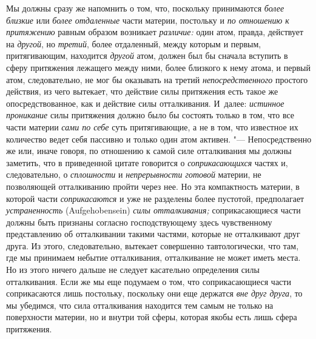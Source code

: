 Мы должны сразу же напомнить о том, что, поскольку принимаются
{\em более близкие} или {\em более
отдаленные} части материи, постольку и {\em по
отношению к притяжению} равным образом возникает
{\em различие:} один атом, правда, действует на {\em другой}, но {\em третий},
более отдаленный, между которым и первым, притягивающим, находится
{\em другой} атом, должен был бы сначала вступить в
сферу притяжения лежащего между ними, более близкого к нему атома, и первый
атом, следовательно, не мог бы оказывать на третий
{\em непосредственного} простого действия, из чего
вытекает, что действие силы притяжения есть такое же опосредствованное, как
и действие силы отталкивания. И~далее: {\em истинное
проникание} силы притяжения должно было бы состоять только в том, что все
части материи {\em сами по себе} суть притягивающие, а
не в том, что известное их количество ведет себя пассивно и только один
атом активен. "--- Непосредственно же или, иначе говоря, по отношению к самой
силе отталкивания мы должны заметить, что в приведенной цитате говорится о
{\em соприкасающихся} частях и, следовательно, о
{\em сплошности} и
{\em непрерывности готовой} материи, не позволяющей
отталкиванию пройти через нее. Но эта компактность материи, в которой части
{\em соприкасаются} и уже не разделены более пустотой,
предполагает {\em устраненность} (Auf\-ge\-ho\-ben\-sein)
{\em силы отталкивания;} соприкасающиеся части должны
быть признаны согласно господствующему здесь чувственному представлению об
отталкивании такими частями, которые не отталкивают друг друга. Из этого,
следовательно, вытекает совершенно тавтологически, что там, где мы
принимаем небытие отталкивания, отталкивание не может иметь места. Но из
этого ничего дальше не следует касательно определения силы отталкивания.
Если же мы еще подумаем о том, что соприкасающиеся части соприкасаются лишь
постольку, поскольку они еще держатся {\em вне друг
друга}, то мы убедимся, что сила отталкивания находится тем самым не только
на поверхности материи, но и внутри той сферы, которая якобы есть лишь
сфера притяжения.

